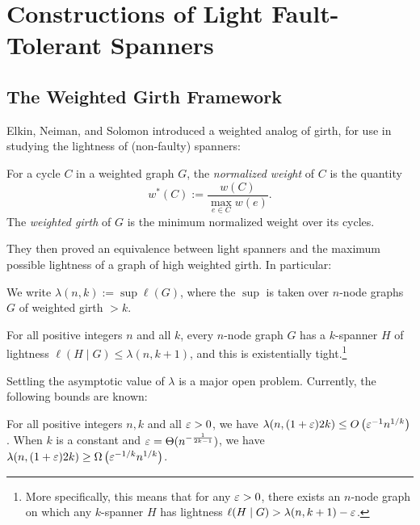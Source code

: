 
\section{Constructions of Light Fault-Tolerant Spanners} \label{sec:upper-main}

\subsection{The Weighted Girth Framework} \label{sec:weighted-girth}

Elkin, Neiman, and Solomon \cite{ENS14} introduced a weighted analog of girth, for use in studying the lightness of (non-faulty) spanners:

\begin{definition} 
For a cycle $C$ in a weighted graph $G$, the \emph{normalized weight} of $C$ is the quantity
$$w^*(C) := \frac{w(C)}{\max_{e \in C} w(e)}.$$
The \emph{weighted girth} of $G$ is the minimum normalized weight over its cycles.
\end{definition}

They then proved an equivalence between light spanners and the maximum possible lightness of a graph of high weighted girth.
In particular:
\begin{definition} 
We write $\lambda(n, k) := \sup \ell(G)$, 
where the $\sup$ is taken over $n$-node graphs $G$ of weighted girth $>k$.
\end{definition}

\begin{theorem}  \label{thm:ENS}
For all positive integers $n$ and all $k$, every $n$-node graph $G$ has a $k$-spanner $H$ of lightness
$\ell(H \mid G) \le \lambda(n, k+1)$,
and this is existentially tight.\footnote{More specifically, this means that for any $\varepsilon > 0$, there exists an $n$-node graph on which any $k$-spanner $H$ has lightness $\ell(H \mid G) > \lambda(n, k+1) - \varepsilon$.}
\end{theorem}

Settling the asymptotic value of $\lambda$ is a major open problem.
Currently, the following bounds are known:

\begin{theorem}  \label{thm:priorlight}
For all positive integers $n, k$ and all $\varepsilon > 0$, we have
$\lambda(n, (1+\varepsilon)2k) \le O\left(\varepsilon^{-1} n^{1/k} \right)$.  When $k$ is a constant and $\varepsilon = \Theta(n^{-\frac{1}{2k-1}})$, we have
$\lambda(n, (1+\varepsilon)2k) \ge \Omega\left(\varepsilon^{-1/k} n^{1/k} \right)$.
\end{theorem}

